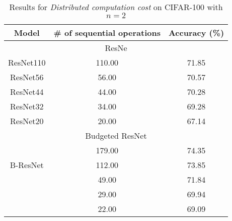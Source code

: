 \begin{table}[]
\centering
\begin{tabular}{|c||cc|}
\hline
Model                     & \# of sequential operations & Accuracy (\%) \\ \hline \hline
\multicolumn{3}{|c|}{ResNe \cite{DBLP:journals/corr/HeZRS15}}                                            \\ \hline
ResNet110                 & 110.00                      & 71.85         \\
ResNet56                  & 56.00                       & 70.57         \\
ResNet44                  & 44.00                       & 70.28         \\
ResNet32                  & 34.00                       & 69.28         \\
ResNet20                  & 20.00                       & 67.14         \\ \hline \hline
\multicolumn{3}{|c|}{Budgeted ResNet}                                   \\ \hline
\multirow{3}{*}{B-ResNet} & 179.00                      & 74.35         \\
                          & 112.00                      & 73.85         \\
                          & 49.00                       & 71.84         \\
                          & 29.00                       & 69.94         \\
                          & 22.00                       & 69.09         \\ \hline
\end{tabular}
\caption{Results for \textit{Distributed computation cost} on CIFAR-100 with $n=2$}
\label{cif100_resnetfab_para2}
\end{table}
